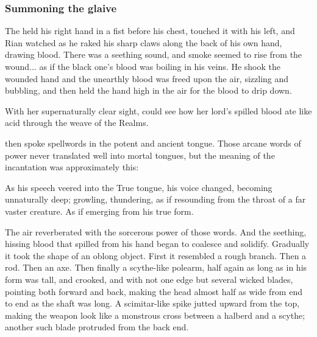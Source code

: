 \subsubsection{Summoning the glaive}
\begin{prose}
  The \scatha{} held his right hand in a fist before his chest, touched it with his left, and Rian watched as he raked his sharp claws along the back of his own hand, drawing blood. There was a seething sound, and smoke seemed to rise from the wound... as if the black one's blood was boiling in his veins. He shook the wounded hand and the unearthly blood was freed upon the air, sizzling and bubbling, and then held the hand high in the air for the blood to drip down. 
  
  
  
  \new
  \index{\xzaishann}%
  With her supernaturally clear sight, \Criseis{} could see how her lord's spilled blood ate like acid through the weave of the Realms. 
  
  \QuessanthIshnaruchaefir{} then spoke spellwords in the potent and ancient  tongue. Those arcane words of power never translated well into mortal tongues, but the meaning of the incantation was approximately this: 
  
  \index{\Rystessakhin}
  \index{\AeocrithRystessakhin}
  \index{\ophidian}
  
  As his speech veered into the True \Draconic{} tongue, his voice changed, becoming unnaturally deep; growling, thundering, as if resounding from the throat of a far vaster creature. 
  As if emerging from his true form. 
  
  The air reverberated with the sorcerous power of those words. 
  And the seething, hissing blood that spilled from his hand began to coalesce and solidify. 
  Gradually it took the shape of an oblong object. 
  First it resembled a rough branch. 
  Then a rod. 
  Then an axe. 
  Then finally a scythe-like polearm, half again as long as \Ishnaruchaefir{} in his \scathaese{} form was tall, and crooked, and with not one edge but several wicked blades, pointing both forward and back, making the head almost half as wide from end to end as the shaft was long. 
  A scimitar-like spike jutted upward from the top, making the weapon look like a monstrous cross between a halberd and a scythe; another such blade protruded from the back end. 
  

\end{prose}
